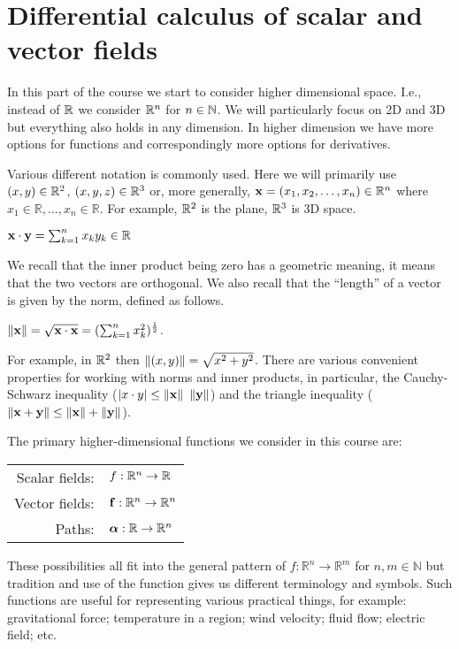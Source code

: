 

\chapter{Differential calculus of scalar and vector fields}

In this part of the course we start to consider higher dimensional space.
I.e., instead of \(\mathbb{R}\) we consider \(\mathbb{R}^n\) for \(n\in \mathbb{N}\).
We will particularly focus on 2D and 3D but everything also holds in any dimension.
In higher dimension we have more options for functions and correspondingly more options for derivatives.

Various different notation is commonly used.
Here we will primarily use \((x,y)\in \mathbb{R}^2\), \((x,y,z)\in\mathbb{R}^3\) or, more generally,  \(\mathbf{x} =(x_1,x_2,\ldots,x_n) \in \mathbb{R}^n \)
where
\( x_1 \in \mathbb{R},\ldots, x_n \in \mathbb{R}\).
For example, \(\mathbb{R}^2\) is the plane, \(\mathbb{R}^3\) is 3D space.

\begin{definition}
    \(\mathbf{x} \cdot \mathbf{y} = \sum_{k=1}^{n} x_k y_k \in \mathbb{R}\)
\end{definition}

We recall that the inner product being zero has a geometric meaning, it means that the two vectors are orthogonal.
We also recall that the ``length'' of a vector is given by the norm, defined as follows.

\begin{definition}[norm]
    \(\left\|\mathbf{x}\right\| =  \sqrt{\mathbf{x} \cdot \mathbf{x}} = (\sum_{k=1}^{n} x_k^2 )^{\frac{1}{2}}\).
\end{definition}

For example, in \(\mathbb{R}^2\) then \(\left\|(x,y)\right\| = \sqrt{x^2 + y^2}\).
There are various convenient properties for working with norms and inner products, in particular, the Cauchy-Schwarz inequality (\(\abs{x\cdot y} \leq \norm{\xx} \ \norm{\yy}\)) and the triangle inequality (\(\left\|\mathbf{x} + \mathbf{y}\right\| \leq \left\|\mathbf{x}\right\| + \left\|\mathbf{y}\right\|\)).

\begin{samepage}
    The primary higher-dimensional functions we consider in this course are:
    \begin{center}
        \begin{tabular}{r l}
            Scalar fields:
             &
            \(f:\mathbb{R}^n \to \mathbb{R}\)            \\
            Vector fields:
             &
            \(\mathbf{f}:\mathbb{R}^n \to \mathbb{R}^n\) \\
            Paths:
             &
            \(\boldsymbol{\alpha}:\mathbb{R} \to \mathbb{R}^n\)
        \end{tabular}
    \end{center}
\end{samepage}
\noindent
These possibilities all fit into the general pattern of \(f:\mathbb{R}^n \to \mathbb{R}^m\) for $n,m\in \mathbb{N}$ but tradition and use of the function gives us different terminology and symbols.
Such functions are useful for representing various practical things, for example:
gravitational force; temperature in a region; wind velocity; fluid flow; electric field; etc.



